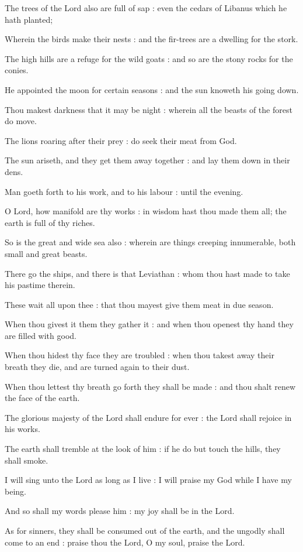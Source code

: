 The trees of the Lord also are full of sap : even the cedars of Libanus which he hath planted;\par
{}Wherein the birds make their nests : and the fir-trees are a dwelling for the stork.\par
{}The high hills are a refuge for the wild goats : and so are the stony rocks for the conies.\par
{}He appointed the moon for certain seasons : and the sun knoweth his going down.\par
{}Thou makest darkness that it may be night : wherein all the beasts of the forest do move.\par
{}The lions roaring after their prey : do seek their meat from God.\par
{}The sun ariseth, and they get them away together : and lay them down in their dens.\par
{}Man goeth forth to his work, and to his labour : until the evening.\par
{}O Lord, how manifold are thy works : in wisdom hast thou made them all; the earth is full of thy riches.\par
{}So is the great and wide sea also : wherein are things creeping innumerable, both small and great beasts.\par
{}There go the ships, and there is that Leviathan : whom thou hast made to take his pastime therein.\par
{}These wait all upon thee : that thou mayest give them meat in due season.\par
{}When thou givest it them they gather it : and when thou openest thy hand they are filled with good.\par
{}When thou hidest thy face they are troubled : when thou takest away their breath they die, and are turned again to their dust.\par
{}When thou lettest thy breath go forth they shall be made : and thou shalt renew the face of the earth.\par
{}The glorious majesty of the Lord shall endure for ever : the Lord shall rejoice in his works.\par
{}The earth shall tremble at the look of him : if he do but touch the hills, they shall smoke.\par
{}I will sing unto the Lord as long as I live : I will praise my God while I have my being.\par
{}And so shall my words please him : my joy shall be in the Lord.\par
{}As for sinners, they shall be consumed out of the earth, and the ungodly shall come to an end : praise thou the Lord, O my soul, praise the Lord.\par

